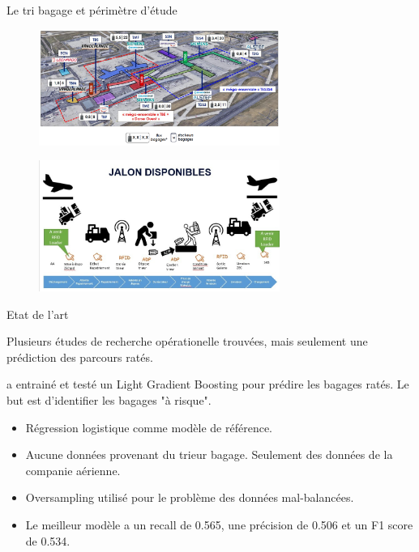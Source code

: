 \documentclass{beamer}
\begin{document}
\begin{frame}{Le tri bagage et périmètre d'étude}
    \begin{figure}[h]
        \includegraphics[width=0.7\textwidth]{Plan trieur.png}\\
        \label{fig:Plan trieur}
    \end{figure}
    \begin{figure}[h]
        \includegraphics[width=0.7\textwidth]{Jalons tri bagage.jpg}\\
        \label{fig:Les différents jalons du tri bagage}
    \end{figure}
\end{frame}



\begin{frame}{Etat de l'art} 

Plusieurs études de recherche opérationelle trouvées, mais seulement une prédiction des parcours ratés.\hfill \break

\cite{MishandledBgas} a entrainé et testé un Light Gradient Boosting pour prédire les bagages ratés. Le but est d'identifier les bagages "à risque". \hfill \break
\begin{itemize}
    \item Régression logistique comme modèle de référence.
    \item Aucune données provenant du trieur bagage. Seulement des données de la companie aérienne.
    \item Oversampling utilisé pour le problème des données mal-balancées.
    \item Le meilleur modèle a un recall de 0.565, une précision de 0.506 et un F1 score de 0.534.
\end{itemize}
\end{frame}
\end{document}
